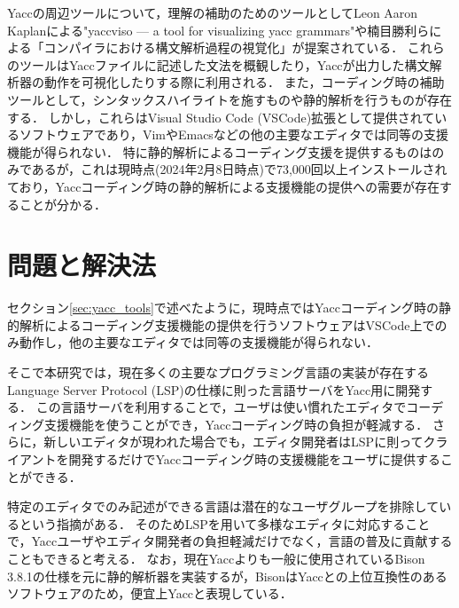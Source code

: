\documentclass[fontsize=9bp,twocolumn,column_gap=2.36zw,a4paper,report]{jlreq}
\begin{document}
Yaccの周辺ツールについて，理解の補助のためのツールとしてLeon Aaron Kaplanによる"yaccviso — a tool for visualizing yacc grammars"\cite{yaccviso}や楠目勝利らによる「コンパイラにおける構文解析過程の視覚化」\cite{parserviso}が提案されている．
これらのツールはYaccファイルに記述した文法を概観したり，Yaccが出力した構文解析器の動作を可視化したりする際に利用される．
また，コーディング時の補助ツールとして，シンタックスハイライトを施すもの\cite{vscode-yacc}や静的解析を行うもの\cite{yash}が存在する．
しかし，これらはVisual Studio Code (VSCode)拡張として提供されているソフトウェアであり，VimやEmacsなどの他の主要なエディタでは同等の支援機能が得られない．
特に静的解析によるコーディング支援を提供するものは\cite{yash}のみであるが，これは現時点(2024年2月8日時点)で73,000回以上インストールされており，Yaccコーディング時の静的解析による支援機能の提供への需要が存在することが分かる．

\begin{figure}[h]
\end{figure}

\chapter{問題と解決法}

セクション\ref{sec:yacc_tools}で述べたように，現時点ではYaccコーディング時の静的解析によるコーディング支援機能の提供を行うソフトウェアはVSCode上でのみ動作し，他の主要なエディタでは同等の支援機能が得られない．\par
そこで本研究では，現在多くの主要なプログラミング言語の実装が存在するLanguage Server Protocol (LSP)\cite{lsp}の仕様に則った言語サーバをYacc用に開発する．
この言語サーバを利用することで，ユーザは使い慣れたエディタでコーディング支援機能を使うことができ，Yaccコーディング時の負担が軽減する．
さらに，新しいエディタが現われた場合でも，エディタ開発者はLSPに則ってクライアントを開発するだけでYaccコーディング時の支援機能をユーザに提供することができる．\par
特定のエディタでのみ記述ができる言語は潜在的なユーザグループを排除しているという指摘\cite{decoupling}がある．
そのためLSPを用いて多様なエディタに対応することで，Yaccユーザやエディタ開発者の負担軽減だけでなく，言語の普及に貢献することもできると考える．
なお，現在Yaccよりも一般に使用されているBison 3.8.1の仕様を元に静的解析器を実装するが，BisonはYaccとの上位互換性のあるソフトウェアのため，便宜上Yaccと表現している．
\end{document}
